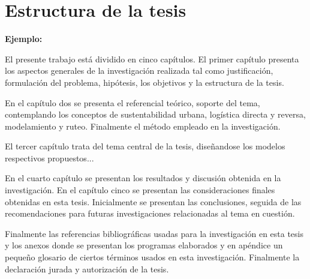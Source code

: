 \section{Estructura de la tesis}

{\bf Ejemplo:}\par
\vskip 0.1cm
El presente trabajo está dividido en cinco capítulos. El primer capítulo presenta los aspectos generales de la investigación realizada tal como justificación, formulación del problema, hipótesis, los objetivos y la estructura de la tesis.

En el capítulo dos se presenta el referencial teórico, soporte del tema, contemplando los conceptos de sustentabilidad urbana, logística directa y reversa, modelamiento y ruteo. Finalmente el método empleado en la investigación.

El tercer capítulo trata del tema central de la tesis, diseñandose los modelos respectivos propuestos...   

 En el cuarto capítulo se presentan los resultados y discusión obtenida en la investigación. En el capítulo cinco se presentan las consideraciones finales obtenidas en esta tesis. Inicialmente se presentan las conclusiones, seguida de las recomendaciones para futuras investigaciones relacionadas al tema en cuestión.

Finalmente las referencias bibliográficas usadas para la investigación en esta tesis y los anexos donde se presentan los programas elaborados y en apéndice un pequeño glosario de ciertos términos usados en esta investigación. Finalmente la declaración jurada y autorización de la tesis.

